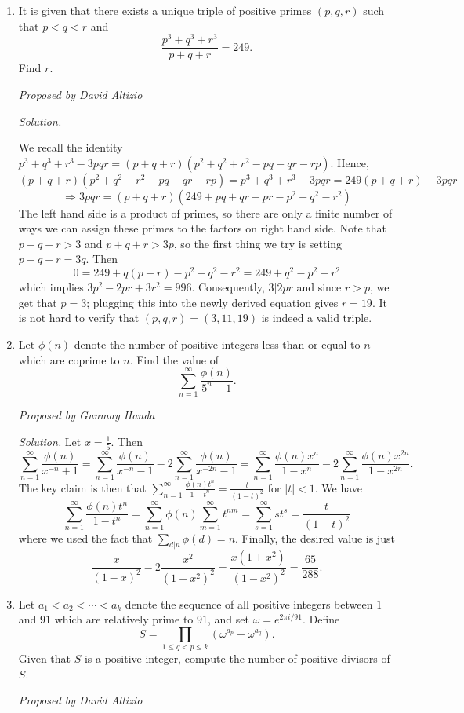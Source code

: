 \documentclass[10pt]{article}
\newcommand{\proposed}[1]
{
\vspace{5pt}
\noindent\textit{Proposed by #1}
}
\newcommand{\solution}
{
\vspace{5pt}
\noindent\textit{Solution.}\qquad
}
\begin{document}
\begin{enumerate}
\item It is given that there exists a unique triple of positive primes $(p,q,r)$ such that $p<q<r$ and \[\dfrac{p^3+q^3+r^3}{p+q+r} = 249.\] Find $r$.

\proposed{David Altizio}

\solution
We recall the identity $p^3+q^3+r^3-3pqr=(p+q+r)(p^2+q^2+r^2-pq-qr-rp)$. Hence, 
$$(p+q+r)(p^2+q^2+r^2-pq-qr-rp)=p^3+q^3+r^3-3pqr=249(p+q+r)-3pqr $$ $$\Longrightarrow 3pqr=(p+q+r)(249+pq+qr+pr-p^2-q^2-r^2) $$ The left hand side is a product of primes, so there are only a finite number of ways we can assign these primes to the factors on right hand side. Note that $p+q+r>3$ and $p+q+r>3p$, so the first thing we try is setting $p+q+r=3q$. Then $$0=249+q(p+r)-p^2-q^2-r^2=249+q^2-p^2-r^2$$ which implies $3p^2-2pr+3r^2=996$. Consequently, $3|2pr$ and since $r>p$, we get that $p=3$; plugging this into the newly derived equation gives $r=\boxed{19}$. It is not hard to verify that $(p,q,r)=(3,11,19)$ is indeed a valid triple. 

\item Let $\phi(n)$ denote the number of positive integers less than or equal to $n$ which are coprime to $n$. Find the value of$$\sum_{n=1}^{\infty}\frac{\phi(n)}{5^n+1}.$$

\proposed{Gunmay Handa}

\solution Let $x=\frac{1}{5}$. Then $$\sum_{n=1}^{\infty}\frac{\phi(n)}{x^{-n}+1}=\sum_{n=1}^{\infty}\frac{\phi(n)}{x^{-n}-1}-2\sum_{n=1}^{\infty}\frac{\phi(n)}{x^{-2n}-1}=\sum_{n=1}^{\infty}\frac{\phi(n)x^n}{1-x^n}-2\sum_{n=1}^{\infty}\frac{\phi(n)x^{2n}}{1-x^{2n}}.$$ The key claim is then that $\sum_{n=1}^{\infty}\frac{\phi(n)t^n}{1-t^n}=\frac{t}{(1-t)^2}$ for $|t|<1$. We have $$\sum_{n=1}^{\infty}\frac{\phi(n)t^n}{1-t^n}=\sum_{n=1}^{\infty}\phi(n)\sum_{m=1}^{\infty}t^{nm}=\sum_{s=1}^{\infty}st^s=\frac{t}{(1-t)^2}$$ where we used the fact that $\sum_{d|n}\phi(d)=n$. Finally, the desired value is just $$\frac{x}{(1-x)^2}-2\frac{x^2}{(1-x^2)^2} =\frac{x(1+x^2)}{(1-x^2)^2}=\boxed{\frac{65}{288}}.$$

\item Let $a_1 < a_2 < \cdots < a_k$ denote the sequence of all positive integers between $1$ and $91$ which are relatively prime to $91$, and set $\omega = e^{2\pi i/91}$. Define \[S = \prod_{1\leq q < p\leq k}\left(\omega^{a_p} - \omega^{a_q}\right).\] Given that $S$ is a positive integer, compute the number of positive divisors of $S$.

\proposed{David Altizio}


\end{enumerate}
\end{document}
